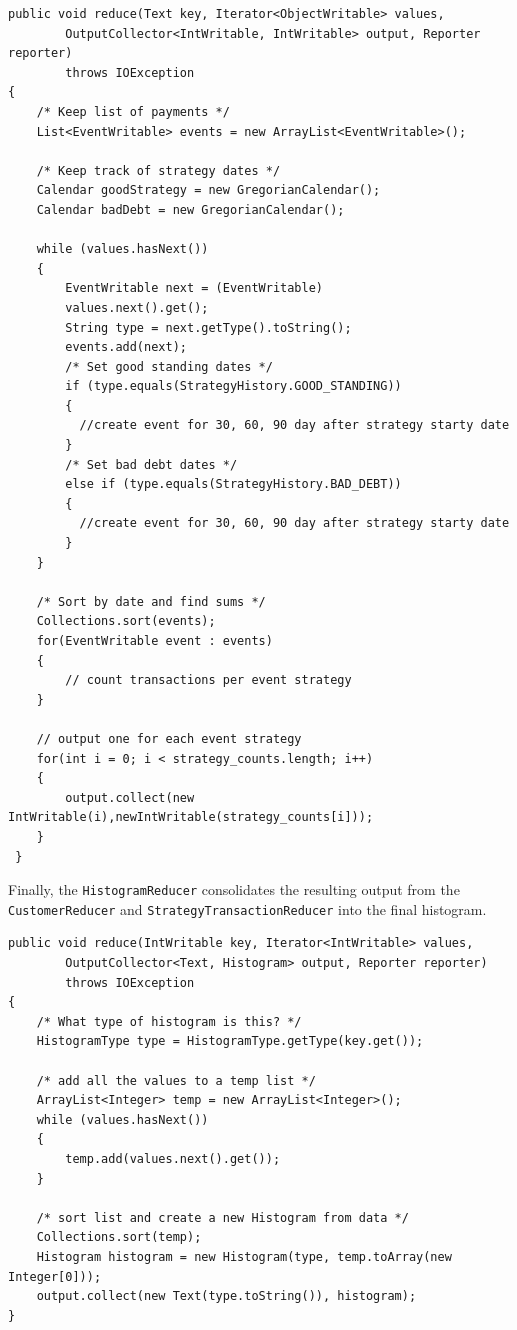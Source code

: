 {
\singlespace
\small
\begin{verbatim}
public void reduce(Text key, Iterator<ObjectWritable> values,
        OutputCollector<IntWritable, IntWritable> output, Reporter reporter)
        throws IOException 
{
    /* Keep list of payments */
    List<EventWritable> events = new ArrayList<EventWritable>();

    /* Keep track of strategy dates */
    Calendar goodStrategy = new GregorianCalendar();
    Calendar badDebt = new GregorianCalendar();

    while (values.hasNext()) 
    {
        EventWritable next = (EventWritable)        
        values.next().get();
        String type = next.getType().toString();
        events.add(next);
        /* Set good standing dates */
        if (type.equals(StrategyHistory.GOOD_STANDING)) 
        {
          //create event for 30, 60, 90 day after strategy starty date 
        }
        /* Set bad debt dates */
        else if (type.equals(StrategyHistory.BAD_DEBT)) 
        {
          //create event for 30, 60, 90 day after strategy starty date
        }
    }
        
    /* Sort by date and find sums */
    Collections.sort(events);
    for(EventWritable event : events) 
    {
        // count transactions per event strategy
    }

    // output one for each event strategy
    for(int i = 0; i < strategy_counts.length; i++)
    {
        output.collect(new IntWritable(i),newIntWritable(strategy_counts[i]));
    }
 }
\end{verbatim}
}

Finally, the {\tt HistogramReducer} consolidates the resulting output from the \\{\tt CustomerReducer} and {\tt StrategyTransactionReducer} into the final histogram.
{
\singlespace
\small
\begin{verbatim}
public void reduce(IntWritable key, Iterator<IntWritable> values,
        OutputCollector<Text, Histogram> output, Reporter reporter)
        throws IOException 
{
    /* What type of histogram is this? */
    HistogramType type = HistogramType.getType(key.get());

    /* add all the values to a temp list */
    ArrayList<Integer> temp = new ArrayList<Integer>();	
    while (values.hasNext()) 
    {
        temp.add(values.next().get());
    }

    /* sort list and create a new Histogram from data */
    Collections.sort(temp);
    Histogram histogram = new Histogram(type, temp.toArray(new Integer[0]));
    output.collect(new Text(type.toString()), histogram);
}
\end{verbatim}
}

